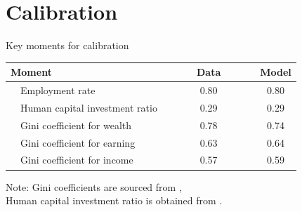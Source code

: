 \documentclass[serif, aspectratio=169]{beamer}
\theoremstyle{remark}
\theoremstyle{plain}
\begin{document}
\section{Calibration}
\begin{frame}{Key moments for calibration}
\begin{table}

\begin{centering}
\begin{tabular}{lccccrrrc}
\hline 
\hline Moment &  &  &  & Data &  &  &  & Model\tabularnewline
\hline 
~~Employment rate &  &  &  & 0.80 &  &  &  & 0.80\tabularnewline
~~Human capital investment ratio &  &  &  & 0.29 &  &  &  & 0.29\tabularnewline
~~Gini coefficient for wealth &  &  &  & 0.78 &  &  &  & 0.74\tabularnewline
~~Gini coefficient for earning &  &  &  & 0.63 &  &  &  & 0.64\tabularnewline
~~Gini coefficient for income &  &  &  & 0.57 &  &  &  & 0.59\tabularnewline
\hline 
\end{tabular}
\par\end{centering}
{\scriptsize Note: Gini coefficients are sourced from \cite{DiazGimenez1997},\\
Human capital investment ratio is obtained from \cite{OECD1998}.}{\scriptsize\par}
\end{table}

    
\end{frame}
\end{document}
